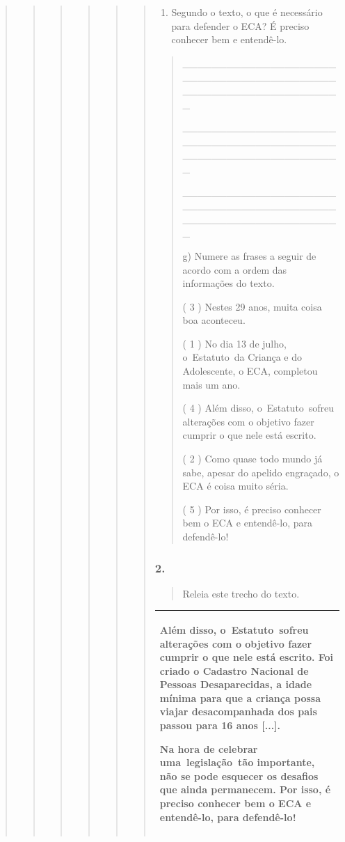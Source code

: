 \begin{quote}
\begin{quote}
\begin{quote}
\begin{quote}
\begin{quote}
\begin{quote}
\begin{enumerate}
\def\labelenumi{\alph{enumi})}
\item
  Segundo o texto, o que é necessário para defender o ECA? É preciso
  conhecer bem e entendê-lo.
\end{enumerate}

\begin{quote}
\_\_\_\_\_\_\_\_\_\_\_\_\_\_\_\_\_\_\_\_\_\_\_\_\_\_\_\_\_\_\_\_\_\_\_\_\_\_\_\_\_\_\_\_\_\_\_\_\_\_\_\_\_\_\_\_\_\_\_\_\_\_\_\_

\_\_\_\_\_\_\_\_\_\_\_\_\_\_\_\_\_\_\_\_\_\_\_\_\_\_\_\_\_\_\_\_\_\_\_\_\_\_\_\_\_\_\_\_\_\_\_\_\_\_\_\_\_\_\_\_\_\_\_\_\_\_\_\_

\_\_\_\_\_\_\_\_\_\_\_\_\_\_\_\_\_\_\_\_\_\_\_\_\_\_\_\_\_\_\_\_\_\_\_\_\_\_\_\_\_\_\_\_\_\_\_\_\_\_\_\_\_\_\_\_\_\_\_\_\_\_\_\_

g) Numere as frases a seguir de acordo com a ordem das informações do
texto.

( 3 ) Nestes 29 anos, muita coisa boa aconteceu.

( 1 ) No dia 13 de julho, o~Estatuto~da Criança e do Adolescente, o ECA,
completou mais um ano.

( 4 ) Além disso, o~Estatuto~sofreu alterações com o objetivo fazer
cumprir o que nele está escrito.

( 2 ) Como quase todo mundo já sabe, apesar do apelido engraçado, o ECA
é coisa muito séria.

( 5 ) Por isso, é preciso conhecer bem o ECA e entendê-lo, para
defendê-lo!
\end{quote}

\subsubsection{2. }\label{section-61}

\begin{quote}
Releia este trecho do texto.
\end{quote}

\begin{longtable}[]{@{}l@{}}
\toprule
\begin{minipage}[t]{0.97\columnwidth}\raggedright\strut
Além disso, o~Estatuto~sofreu alterações com o objetivo fazer cumprir o
que nele está escrito. Foi criado o Cadastro Nacional de Pessoas
Desaparecidas, a idade mínima para que a criança possa viajar
desacompanhada dos pais passou para 16 anos {[}...{]}.

Na hora de celebrar uma~legislação~tão importante, não se pode esquecer
os desafios que ainda permanecem. Por isso, é preciso conhecer bem o ECA
e entendê-lo, para defendê-lo!\strut
\end{minipage}\tabularnewline
\bottomrule
\end{longtable}


\end{quote}
\end{quote}
\end{quote}
\end{quote}
\end{quote}
\end{quote}

